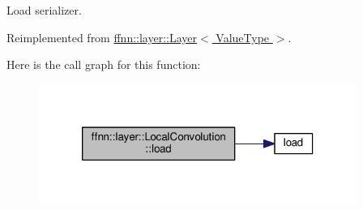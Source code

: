 Load serializer. 



Reimplemented from \hyperlink{classffnn_1_1layer_1_1_layer_a23f5f3c958d888632010327471c7b012}{ffnn\-::layer\-::\-Layer$<$ Value\-Type $>$}.



Here is the call graph for this function\-:
\nopagebreak
\begin{figure}[H]
\begin{center}
\leavevmode
\includegraphics[width=294pt]{classffnn_1_1layer_1_1_local_convolution_ae45649dd2f6479208a3694bfab9df39d_cgraph}
\end{center}
\end{figure}


